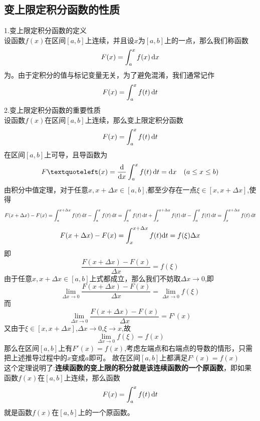 \subsection{变上限定积分函数的性质}
\noindent 1.变上限定积分函数的定义\\
\kg 设函数$f(x)$在区间$[a,b]$上连续，并且设$x$为$[a,b]$上的一点，那么我们称函数
\begin{equation}
	F(x)=\int_{a}^{x}f(x) \,{\rm{d}} x
\end{equation}
为。由于定积分的值与标记变量无关，为了避免混淆，我们通常记作
\begin{equation}
	F(x)=\int_{a}^{x}f(t)\,{\rm{d}} t
\end{equation}
2.变上限定积分函数的重要性质\\

\sj
\theorem[变上限定积分函数的性质]
设函数$f(x)$在区间$[a,b]$上连续，那么变上限定积分函数
\begin{equation}
	\nonumber
	F(x)=\int_{a}^{x}f(t) \,{\rm{d}} t
\end{equation}
在区间$[a,b]$上可导，且导函数为
\begin{equation}
	\nonumber
	F‘(x)=\frac{\d}{\d x}\int_{a}^{x}f(t) \,\d t=\d x  \hspace{1em}(a\leq x\leq b)
\end{equation}
\proof 由积分中值定理，对于任意$x,x+\Delta x\in[a,b]$,都至少存在一点$\xi\in[x,x+\Delta x]$,使得\sj
\begin{equation}
	\nonumber
	F(x+\Delta x)-F(x)=\int_{a}^{x+\Delta x}f(t)\,{\rm{d}} t-\int_{a}^{x}f(t)\,{\rm{d}} t=\int_{a}^{x}f(t)\,{\rm{d}} t+\int_{x}^{x+\Delta x}f(t)\,{\rm{d}} t-\int_{a}^{x}f(t)\,{\rm{d}} t=\int_{x}^{x+\Delta x}f(t)\,{\rm{d}} t
\end{equation}
\begin{equation}
	\nonumber
	F(x+\Delta x)-F(x)=\int_{x}^{x+\Delta x}f(t){\rm{d}} t=f(\xi)\Delta x
\end{equation}
即
\begin{equation}
	\nonumber
	\frac{F(x+\Delta x)-F(x)}{\Delta x}=f(\xi)
\end{equation}
由于任意$x,x+\Delta x\in[a,b]$上式都成立，那么我们不妨取$\Delta x\to 0$,即
\begin{equation}
	\nonumber
	\lim\limits_{\Delta x\to 0}	\frac{F(x+\Delta x)-F(x)}{\Delta x}=	\lim\limits_{\Delta x \to 0}f(\xi)
	\end{equation}
而
\begin{equation}
	\nonumber
	\lim\limits_{\Delta x\to 0}	\frac{F(x+\Delta x)-F(x)}{\Delta x}=F‘(x)
\end{equation}
又由于$\xi\in[x,x+\Delta x]$,$\Delta x\to0$,$\xi\to x$,故
\begin{equation}
	\nonumber
	\lim\limits_{\Delta x\to 0}f(\xi)=f(x)
\end{equation}
那么在区间$[a,b]$上有$F'(x)=f(x)$,考虑左端点和右端点的导数的情形，只需把上述推导过程中的$x$变成$a$即可。
故在区间$[a,b]$上都满足$F‘(x)=f(x)$
\\
这个定理说明了:\textbf{连续函数的变上限的积分就是该连续函数的一个原函数}，即如果函数$f(x)$在$[a,b]$上连续，那么函数
\begin{equation}
	\nonumber
F(x)=\int_{a}^{x}f(t) \,{\rm{d}} t
\end{equation}
就是函数$f(x)$在$[a,b]$上的一个原函数。